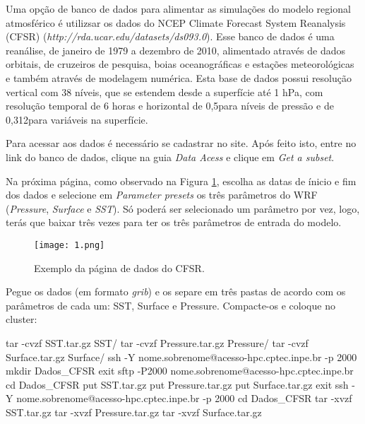 \noindent Uma opção de banco de dados para alimentar as simulações do modelo regional atmosférico é utilizsar os dados do NCEP Climate Forecast System Reanalysis (CFSR) (\textcolor{bleu_cite}{\textit{http://rda.ucar.edu/datasets/ds093.0}}). Esse banco de dados é uma reanálise, de janeiro de 1979 a dezembro de 2010, alimentado através de dados orbitais, de cruzeiros de pesquisa, boias oceanográficas e estações meteorológicas e também através de modelagem numérica. Esta base de dados possui resolução vertical com 38 níveis, que se estendem desde a superfície até 1 hPa, com resolução temporal de 6 horas e horizontal de 0,5\degree para níveis de pressão e de 0,312\degree para variáveis na superfície.
\bigskip

\noindent Para acessar aos dados é necessário se cadastrar no site. Após feito isto, entre no link do banco de dados, clique na guia \textit{Data Acess} e clique em \textit{Get a subset}.
\bigskip

\noindent Na próxima página, como observado na Figura \textcolor{bleu_cite}{\ref{detalhacfsr}}, escolha as datas de ínicio e fim dos dados e selecione em \textit{Parameter presets} os três parâmetros do WRF (\textit{Pressure}, \textit{Surface} e \textit{SST}). Só poderá ser selecionado um parâmetro por vez, logo, terás que baixar três vezes para ter os três parâmetros de entrada do modelo.
\bigskip

\begin{figure}[H]
    \centering
    \texttt{[image: 1.png]}
    \caption{Exemplo da página de dados do CFSR.}
    \label{detalhacfsr}
\end{figure}
\bigskip

\noindent Pegue os dados (em formato \textit{grib}) e os separe em três pastas de acordo com os parâmetros de cada um: SST, Surface e Pressure. Compacte-os e coloque no cluster:
\bigskip

\begin{bashcode}
tar -cvzf SST.tar.gz SST/
tar -cvzf Pressure.tar.gz Pressure/
tar -cvzf Surface.tar.gz Surface/
ssh -Y nome.sobrenome@acesso-hpc.cptec.inpe.br -p 2000
mkdir Dados_CFSR
exit
sftp -P2000 nome.sobrenome@acesso-hpc.cptec.inpe.br
cd Dados_CFSR
put SST.tar.gz
put Pressure.tar.gz
put Surface.tar.gz
exit
ssh -Y nome.sobrenome@acesso-hpc.cptec.inpe.br -p 2000
cd Dados_CFSR
tar -xvzf SST.tar.gz
tar -xvzf Pressure.tar.gz
tar -xvzf Surface.tar.gz
\end{bashcode}
\bigskip


